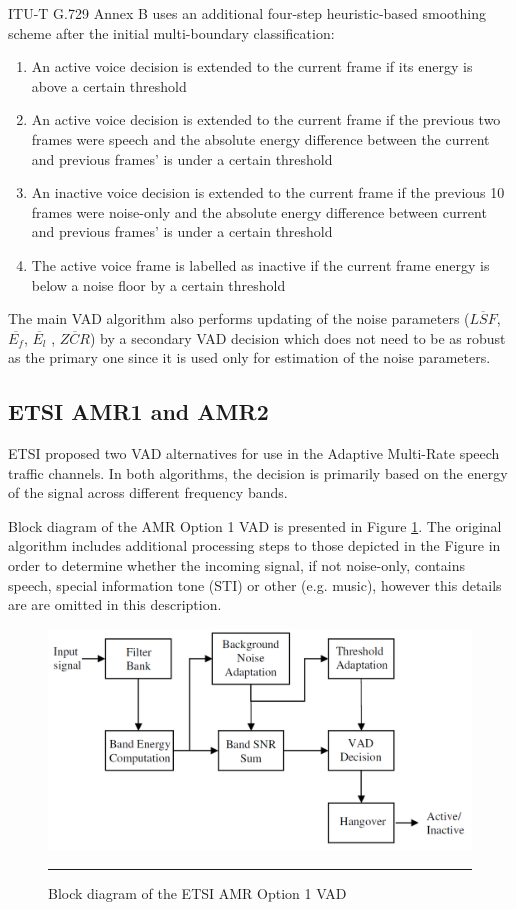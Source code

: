ITU-T G.729 Annex B uses an additional four-step heuristic-based smoothing scheme after the initial multi-boundary classification:
\begin{enumerate}
\item An active voice decision is extended to the current frame if its energy is above a certain threshold
\item An active voice decision is extended to the current frame if the previous two frames were speech and the absolute energy difference between the current and previous frames' is under a certain threshold
\item An inactive voice decision is extended to the current frame if the previous 10 frames were noise-only and the absolute energy difference between current and previous frames' is under a certain threshold
\item The active voice frame is labelled as inactive if the current frame energy is below a noise floor by a certain threshold
\end{enumerate}

The main VAD algorithm also performs updating of the noise parameters ($\overline{LSF}$, $\overline{E_f}$, $\overline{E_l}$ , $\overline{ZCR}$) by a secondary VAD decision which does not need to be as robust as the primary one since it is used only for estimation of the noise parameters.

\subsection{ETSI AMR1 and AMR2}

ETSI proposed two VAD alternatives for use in the Adaptive Multi-Rate speech traffic channels. In both algorithms, the decision is primarily based on the energy of the signal across different frequency bands.

Block diagram of the AMR Option 1 VAD is presented in Figure \ref{fig:AMR1}. The original algorithm includes additional processing steps to those depicted in the Figure in order to determine whether the incoming signal, if not noise-only, contains speech, special information tone (STI) or other (e.g. music), however this details are are omitted in this description.

\begin{figure}[htbp]
	\centering
		\includegraphics[width=0.9\columnwidth]{Figures/AMR1.png}
		\rule{37em}{0.5pt}
	\caption[Block diagram of the ETSI AMR Option 1 VAD]{Block diagram of the ETSI AMR Option 1 VAD \cite{Kondoz}}
	\label{fig:AMR1}
\end{figure}


